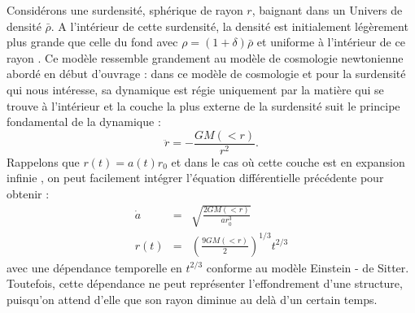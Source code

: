 Considérons une surdensité, sphérique de rayon $r$, baignant dans un Univers de densité $\bar \rho$. A l'intérieur de cette surdensité, la densité est initialement légèrement plus grande que celle du fond avec $\rho = (1+\delta) \bar \rho$ et uniforme à l'intérieur de ce rayon .  Ce modèle ressemble grandement au modèle de cosmologie newtonienne  abordé en début d'ouvrage : dans ce modèle de cosmologie et pour la surdensité qui nous intéresse, sa dynamique est régie uniquement par la matière qui se trouve à l'intérieur et la couche la plus externe de la surdensité suit le principe fondamental de la dynamique :
\begin{equation}
\ddot r = -\frac{GM(<r)}{r^2}.
\end{equation}
Rappelons que $r(t)=a(t)r_0$ et dans le cas où cette couche est en expansion infinie , on peut facilement intégrer l'équation différentielle précédente pour obtenir :
\begin{eqnarray}
\dot a &=&\sqrt{\frac{2GM(<r)}{ar_0^3}}\\
r(t)&=&\left(\frac{9GM(<r)}{2}\right)^{1/3} t^{2/3}
\end{eqnarray}
avec une dépendance temporelle en $t^{2/3}$ conforme au modèle Einstein - de Sitter. Toutefois, cette dépendance ne peut représenter l'effondrement d'une structure, puisqu'on attend d'elle que son rayon diminue au delà d'un certain temps.

